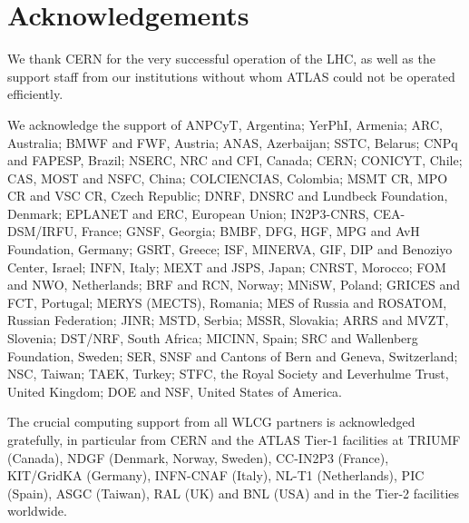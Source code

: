\documentclass[11pt,a4paper,dvips]{article}
\begin{document}

\section{Acknowledgements}

We thank CERN for the very successful operation of the LHC, as well as the
support staff from our institutions without whom ATLAS could not be
operated efficiently.

We acknowledge the support of ANPCyT, Argentina; YerPhI, Armenia; ARC,
Australia; BMWF and FWF, Austria; ANAS, Azerbaijan; SSTC, Belarus; CNPq and FAPESP,
Brazil; NSERC, NRC and CFI, Canada; CERN; CONICYT, Chile; CAS, MOST and NSFC,
China; COLCIENCIAS, Colombia; MSMT CR, MPO CR and VSC CR, Czech Republic;
DNRF, DNSRC and Lundbeck Foundation, Denmark; EPLANET and ERC, European Union;
IN2P3-CNRS, CEA-DSM/IRFU, France; GNSF, Georgia; BMBF, DFG, HGF, MPG and AvH
Foundation, Germany; GSRT, Greece; ISF, MINERVA, GIF, DIP and Benoziyo Center,
Israel; INFN, Italy; MEXT and JSPS, Japan; CNRST, Morocco; FOM and NWO,
Netherlands; BRF and RCN, Norway; MNiSW, Poland; GRICES and FCT, Portugal; MERYS
(MECTS), Romania; MES of Russia and ROSATOM, Russian Federation; JINR; MSTD,
Serbia; MSSR, Slovakia; ARRS and MVZT, Slovenia; DST/NRF, South Africa;
MICINN, Spain; SRC and Wallenberg Foundation, Sweden; SER, SNSF and Cantons of
Bern and Geneva, Switzerland; NSC, Taiwan; TAEK, Turkey; STFC, the Royal
Society and Leverhulme Trust, United Kingdom; DOE and NSF, United States of
America.

The crucial computing support from all WLCG partners is acknowledged
gratefully, in particular from CERN and the ATLAS Tier-1 facilities at
TRIUMF (Canada), NDGF (Denmark, Norway, Sweden), CC-IN2P3 (France),
KIT/GridKA (Germany), INFN-CNAF (Italy), NL-T1 (Netherlands), PIC (Spain),
ASGC (Taiwan), RAL (UK) and BNL (USA) and in the Tier-2 facilities
worldwide.
\end{document}
